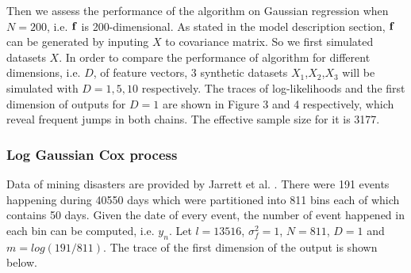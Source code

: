 \documentclass{article}
\begin{document}

Then we assess the performance of the algorithm on Gaussian regression when $N=200$, i.e. $\bf{f}$ is 200-dimensional. As stated in the model description section, $\bf{f}$ can be generated by inputing $X$ to covariance matrix. So we first simulated datasets $X$. In order to compare the performance of algorithm for different dimensions, i.e. $D$, of feature vectors, 3 synthetic datasets $X_1$,$X_2$,$X_3$ will be simulated with $D = 1,5,10$ respectively. 
The traces of log-likelihoods and the first dimension of outputs for $D=1$ are shown in Figure 3 and 4 respectively, which reveal frequent jumps in both chains. The effective sample size for it is 3177.

\subsubsection{Log Gaussian Cox process}

Data of mining disasters are provided by Jarrett et al. \cite{Jarrett}. There were 191 events happening during 40550 days which were partitioned into 811 bins each of which contains 50 days. Given the date of every event, the number of event happened in each bin can be computed, i.e. $y_n$. Let $l=13516$, $\sigma_f^2 = 1$, $N = 811$, $D=1$ and $m=log(191/811)$. The trace of the first dimension of the output is shown below.
\end{document}
